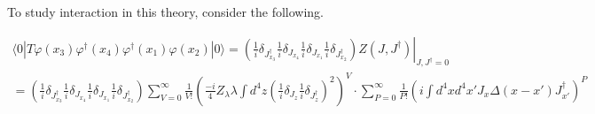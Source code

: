 \documentclass[twoside]{amsart}
\begin{document}
To study interaction in this theory, consider the following.  

\[
\begin{gathered}
  \langle 0 | T\varphi(x_3) \varphi^{\dag}(x_4) \varphi^{\dag}(x_1) \varphi(x_2) | 0 \rangle = \left. \left( \frac{1}{i} \delta_{J^{\dag}_{x_3}} \frac{1}{i} \delta_{J_{x_4}} \frac{1}{i} \delta_{J_{x_1}} \frac{1}{i} \delta_{J^{\dag}_{x_2} } \right) Z(J,J^{\dag}) \right|_{J,J^{\dag} = 0} \\
  = \left( \frac{1}{i} \delta_{J^{\dag}_{x_3}} \frac{1}{i} \delta_{J_{x_4}} \frac{1}{i} \delta_{J_{x_1}} \frac{1}{i} \delta_{J^{\dag}_{x_2} } \right) \sum_{V=0}^{\infty} \frac{1}{V!} \left( \frac{-i}{4} Z_{\lambda} \lambda \int d^4z \left( \frac{1}{i} \delta_{J_z} \frac{1}{i} \delta_{J_z^{\dag}} \right)^2 \right)^V \cdot \sum_{P=0}^{\infty} \frac{1}{P!} \left( i \int d^4x d^4x' J_x \Delta(x-x') J_{x'}^{\dag} \right)^P 
\end{gathered}
\]






\end{document}
